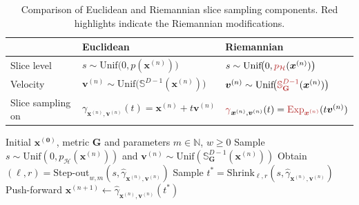 \begin{table}[t]
\centering
\small
\begin{tabular}{lll}
\toprule
 & Euclidean & Riemannian \\
\midrule
Slice level 
& $s \sim \mathrm{Unif}\!\bigl(0, p(\boldsymbol{x}^{(n)})\bigr)$
& $s \sim \mathrm{Unif}\!\bigl(0, \textcolor{mycolor}{p_{\mathcal{H}}}(\boldsymbol{x}^{(n)})\bigr)$ \\

Velocity 
& $\boldsymbol{v}^{(n)} \sim \mathrm{Unif}\!\bigl(\mathbb{S}^{D-1}(\boldsymbol{x}^{(n)})\bigr)$
& $\boldsymbol{v}^{(n)} \sim \mathrm{Unif}\!\bigl(\textcolor{mycolor}{\mathbb{S}^{D-1}_{\mathbf{G}}}(\boldsymbol{x}^{(n)})\bigr)$ \\

Slice sampling on 
& $\gamma_{\boldsymbol{x}^{(n)},\boldsymbol{v}^{(n)}}(t) = \boldsymbol{x}^{(n)} + t\boldsymbol{v}^{(n)}$
& $\textcolor{mycolor}{{\gamma}}_{\boldsymbol{x}^{(n)},\boldsymbol{v}^{(n)}}(t) 
= \textcolor{mycolor}{\operatorname{Exp}_{\boldsymbol{x}^{(n)}}}(t\boldsymbol{v}^{(n)})$ \\

\bottomrule
\end{tabular}
\caption{Comparison of Euclidean and Riemannian slice sampling components. Red highlights indicate the Riemannian modifications.}
\label{tab:slice_compare}
\end{table}



\begin{algorithm}[t]
    \caption{Geodesic slice sampling, producing $N$ samples $\boldsymbol{x}^{(n)}$.}    
	    \begin{algorithmic}[1]        
	    \Require Initial $\boldsymbol{x^{(0)}}$, metric $\mathbf{G}$ and parameters $m\in \mathbb{N}$, $w\ge 0$	        
                \State Sample $s \sim \mathrm{Unif}(0, p_{\mathcal{H}}(\boldsymbol{x}^{(n)}))$ and $\boldsymbol{v}^{(n)} \sim \textrm{Unif}(\mathbb{S}_{\mathbf{G}}^{D-1}(\boldsymbol{x}^{(n)}))$
	            \State Obtain $(\ell, r) = \text{Step-out}_{w,m}(s, \hat{\gamma}_{\boldsymbol{x}^{(n)}, \boldsymbol{v}^{(n)}})$
	            \State Sample $t^* = \text{Shrink}_{\ell,r}(s, \hat{\gamma}_{\boldsymbol{x}^{(n)}, \boldsymbol{v}^{(n)}} )$
                \State Push-forward $\boldsymbol{x}^{(n+1)} \gets \hat{\gamma}_{\boldsymbol{x}^{(n)}, \boldsymbol{v}^{(n)}} (t^*)
                $
	        \EndFor
	\end{algorithmic}
	\label{alg:gss}
\end{algorithm}




